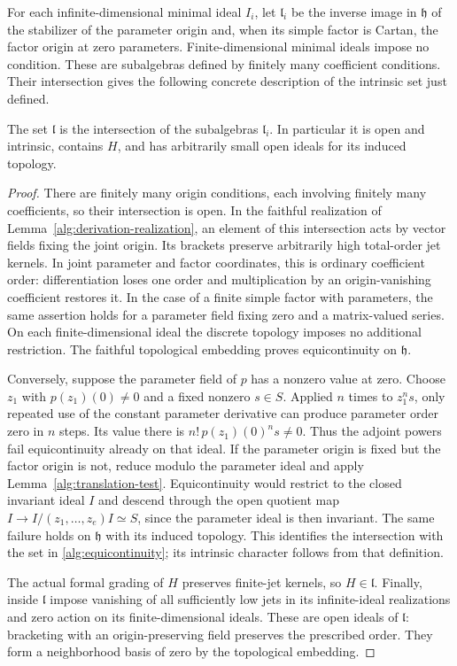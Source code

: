 For each infinite-dimensional minimal ideal $I_i$, let
$\mathfrak l_i$ be the inverse image in $\mathfrak h$ of the stabilizer
of the parameter origin and, when its simple factor is Cartan, the
factor origin at zero parameters. Finite-dimensional minimal ideals
impose no condition. These are subalgebras defined by finitely many
coefficient conditions. Their intersection gives the following concrete
description of the intrinsic set just defined.

\begin{lemma}
\label{alg:intrinsic-l}
The set $\mathfrak l$ is the intersection of the subalgebras
$\mathfrak l_i$. In particular it is open and intrinsic, contains $H$,
and has arbitrarily small open ideals for its induced topology.
\end{lemma}

\begin{proof}
There are finitely many origin conditions, each involving finitely
many coefficients, so their intersection is open. In the faithful
realization of Lemma~\ref{alg:derivation-realization}, an element of
this intersection acts by vector fields fixing the joint origin. Its
brackets preserve arbitrarily high total-order jet kernels. In joint
parameter and factor coordinates, this is ordinary coefficient order:
differentiation loses one order and multiplication by an
origin-vanishing coefficient restores it. In the
case of a finite simple factor with parameters, the same assertion
holds for a parameter field fixing zero and a matrix-valued series.
On each finite-dimensional ideal the discrete topology imposes no
additional restriction. The faithful topological embedding proves
equicontinuity on $\mathfrak h$.

Conversely, suppose the parameter field of $p$ has a nonzero value
at zero. Choose $z_1$ with $p(z_1)(0)\ne0$ and a fixed nonzero
$s\in S$. Applied $n$ times to $z_1^n s$, only repeated use of the
constant parameter derivative can produce parameter order zero in
$n$ steps. Its value there is
$n!\,p(z_1)(0)^n s\ne0$. Thus the adjoint powers fail
equicontinuity already on that ideal. If the parameter origin is
fixed but the factor origin is not, reduce modulo the parameter
ideal and apply Lemma~\ref{alg:translation-test}. Equicontinuity
would restrict to the closed invariant ideal $I$ and descend through
the open quotient map $I\to I/(z_1,\ldots,z_e)I\simeq S$, since
the parameter ideal is then invariant. The same
failure holds on $\mathfrak h$ with its induced topology. This
identifies the intersection with the set in
\eqref{alg:equicontinuity}; its intrinsic character follows from that
definition.

The actual formal grading of $H$ preserves finite-jet kernels, so
$H\in\mathfrak l$. Finally, inside $\mathfrak l$ impose vanishing
of all sufficiently low jets in its infinite-ideal realizations and
zero action on its finite-dimensional ideals. These are open ideals
of $\mathfrak l$: bracketing with an origin-preserving field
preserves the prescribed order. They form a neighborhood basis of
zero by the topological embedding.
\end{proof}

